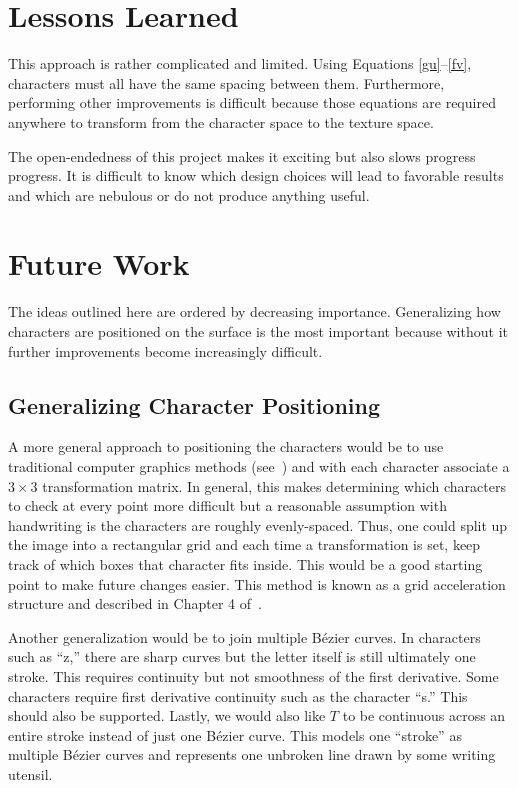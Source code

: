 \documentclass[12pt]{article}
\begin{document}
\section{Lessons Learned}
This approach is rather complicated and limited. Using Equations \eqref{gu}--\eqref{fv}, characters must all have the same spacing between them. Furthermore, performing other improvements is difficult because those equations are required anywhere to transform from the character space to the texture space.

The open-endedness of this project makes it exciting but also slows progress progress. It is difficult to know which design choices will lead to favorable results and which are nebulous or do not produce anything useful.

\section{Future Work}
The ideas outlined here are ordered by decreasing importance. Generalizing how characters are positioned on the surface is the most important because without it further improvements become increasingly difficult.

\subsection{Generalizing Character Positioning}\label{generalize}
A more general approach to positioning the characters would be to use traditional computer graphics methods (see~\cite{pbrt}) and with each character associate a $3 \times 3$ transformation matrix. In general, this makes determining which characters to check at every point more difficult but a reasonable assumption with handwriting is the characters are roughly evenly-spaced. Thus, one could split up the image into a rectangular grid and each time a transformation is set, keep track of which boxes that character fits inside. This would be a good starting point to make future changes easier. This method is known as a grid acceleration structure and described in Chapter 4 of~\cite{pbrt}.

Another generalization would be to join multiple B\'ezier curves. In characters such as ``z,'' there are sharp curves but the letter itself is still ultimately one stroke. This requires continuity but not smoothness of the first derivative. Some characters require first derivative continuity such as the character ``s.'' This should also be supported. Lastly, we would also like $T$ to be continuous across an entire stroke instead of just one B\'ezier curve. This models one ``stroke'' as multiple B\'ezier curves and represents one unbroken line drawn by some writing utensil.
\end{document}

